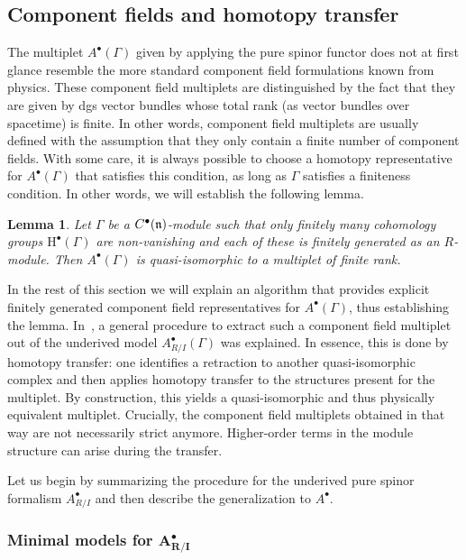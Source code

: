 \documentclass[11pt]{article}
\numberwithin{equation}{section}
\numberwithin{equation}{section}
\newtheorem{lem}[thm]{Lemma}
\begin{document}
\subsection{Component fields and homotopy transfer} \label{sec: components}
The multiplet $A^\bullet(\Gamma)$ given by applying the pure spinor functor does not at first glance resemble the more standard component field formulations known from physics. These component field multiplets are distinguished by the fact that they are given by dgs vector bundles whose total rank (as vector bundles over spacetime) is finite. In other words, component field multiplets are usually defined with the assumption that they only contain a finite number of component fields. With some care, it is always possible to choose a homotopy representative for $A^\bullet(\Gamma)$ that satisfies this condition, as long as $\Gamma$ satisfies a finiteness condition. In other words, we will establish the following lemma.

\begin{lem} \label{fd_model_lemma}
	Let $\Gamma$ be a $C^\bullet(\mathfrak n)$-module such that only finitely many cohomology groups $\mathrm{H}^\bullet(\Gamma)$ are non-vanishing and each of these is finitely generated as an $R$-module. Then $A^\bullet(\Gamma)$ is quasi-isomorphic to a multiplet of finite rank.
\end{lem}

In the rest of this section we will explain an algorithm that provides explicit finitely generated component field representatives for $A^\bullet(\Gamma)$, thus establishing the lemma. In~\cite{perspectives}, a general procedure to extract such a component field multiplet out of the underived model $A^\bullet_{R/I}(\Gamma)$ was explained. In essence, this is done by homotopy transfer: one identifies a retraction to another quasi-isomorphic complex and then applies homotopy transfer to the structures present for the multiplet. By construction, this yields a quasi-isomorphic and thus physically equivalent multiplet. Crucially, the component field multiplets obtained in that way are not necessarily strict anymore. Higher-order terms in the module structure can arise during the transfer.

Let us begin by summarizing the procedure for the underived pure spinor formalism $A^\bullet_{R/I}$ and then describe the generalization to $A^\bullet$.

\subsubsection[Minimal models for A\^{}bullet\_\{R/I\}]{Minimal models for $\boldsymbol{A^\bullet_{R/I}}$}
\end{document}

